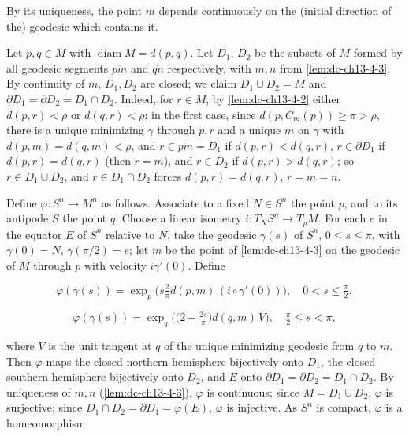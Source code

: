 \begin{remark}
  \label{rem:dc-ch13-4-4}
  By its uniqueness, the point $m$ depends continuously on the (initial direction of
  the) geodesic which contains it.
  
  \sketch
  Let $p,q\in M$ with $\operatorname{diam}M=d(p,q)$. Let $D_1$,
  $D_2$ be the subsets of $M$ formed by all geodesic segments $\overline{pm}$ and
  $\overline{qn}$ respectively, with $m,n$ from \cref{lem:dc-ch13-4-3}. By continuity of $m$, $D_1,D_2$ are closed; we claim $D_1\cup D_2=M$ and
  $\partial D_1=\partial D_2=D_1\cap D_2$. Indeed, for $r\in M$, by \cref{lem:dc-ch13-4-2} either
  $d(p,r)<\rho$ or $d(q,r)<\rho$; in the first case, since $d(p,C_m(p))\geq\pi>\rho$,
  there is a unique minimizing $\gamma$ through $p,r$ and a unique $m$ on $\gamma$ with
  $d(p,m)=d(q,m)<\rho$, and $r\in\overline{pm}=D_1$ if $d(p,r)<d(q,r)$, $r\in\partial D_1$
  if $d(p,r)=d(q,r)$ (then $r=m$), and $r\in D_2$ if $d(p,r)>d(q,r)$; so
  $r\in D_1\cup D_2$, and $r\in D_1\cap D_2$ forces $d(p,r)=d(q,r)$, $r=m=n$.
  
  Define $\varphi:S^n\to M^n$ as follows. Associate to a fixed $N\in S^n$ the point
  $p$, and to its antipode $S$ the point $q$. Choose a linear isometry
  $i:T_NS^n\to T_pM$. For each $e$ in the equator $E$ of $S^n$ relative to $N$, take
  the geodesic $\gamma(s)$ of $S^n$, $0\leq s\leq\pi$, with $\gamma(0)=N$,
  $\gamma(\pi/2)=e$; let $m$ be the point of \cref{lem:dc-ch13-4-3} on the geodesic of $M$ through
  $p$ with velocity $i\gamma'(0)$. Define
  
  $$
  \varphi(\gamma(s))=\exp_p\!\Big(s\tfrac{2}{\pi}d(p,m)\,(i\circ\gamma'(0))\Big),\quad 0<s\leq\tfrac{\pi}{2},
  $$
  
  $$
  \varphi(\gamma(s))=\exp_q\!\Big(\big(2-\tfrac{2s}{\pi}\big)d(q,m)\,V\Big),\quad\tfrac{\pi}{2}\leq s<\pi,
  $$
  
  where $V$ is the unit tangent at $q$ of the unique minimizing geodesic from $q$ to
  $m$. Then $\varphi$ maps the closed northern hemisphere bijectively onto $D_1$, the
  closed southern hemisphere bijectively onto $D_2$, and $E$ onto
  $\partial D_1=\partial D_2=D_1\cap D_2$. By uniqueness of $m,n$ (\cref{lem:dc-ch13-4-3}),
  $\varphi$ is continuous; since $M=D_1\cup D_2$, $\varphi$ is surjective; since
  $D_1\cap D_2=\partial D_1=\varphi(E)$, $\varphi$ is injective. As $S^n$ is compact,
  $\varphi$ is a homeomorphism.
\end{remark}
